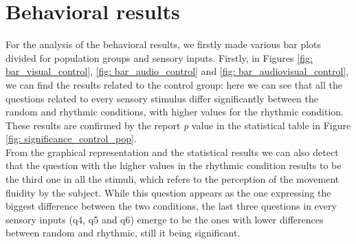 \section{Behavioral results}
For the analysis of the behavioral results, we firstly made various bar plots divided for population groups and sensory inputs. Firstly, in Figures \ref{fig: bar_visual_control}, \ref{fig: bar_audio_control} and \ref{fig: bar_audiovisual_control}, we can find the results related to the control group: here we can see that all the questions related to every sensory stimulus differ significantly between the random and rhythmic conditions, with higher values for the rhythmic condition. These results are confirmed by the report \textit{p} value in the statistical table in Figure \ref{fig: significance_control_pop}. \\
From the graphical representation and the statistical results we can also detect that the question with the higher values in the rhythmic condition results to be the third one in all the stimuli, which refers to the perception of the movement fluidity by the subject. While this question appears as the one expressing the biggest difference between the two conditions, the last three questions in every sensory inputs (q4, q5 and q6) emerge to be the ones with lower differences between random and rhythmic, still it being significant.
